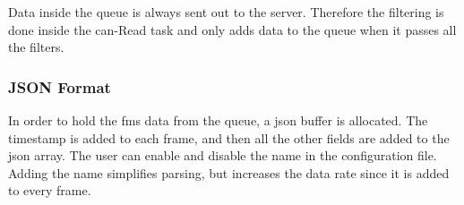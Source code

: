 Data inside the queue is always sent out to the server. Therefore the filtering is done inside the \acrshort{can}-Read task and only adds data to the queue when it passes all the filters.  

\subsubsection{JSON Format}
In order to hold the \acrshort{fms} data from the queue, a \acrshort{json} buffer is allocated. The timestamp is added to each frame, and then all the other fields are added to the \acrshort{json} array. The user can enable and disable the name in the configuration file. Adding the name simplifies parsing, but increases the data rate since it is added to every frame.

\begin{table}[h!]
    \begin{center}
\end{center}
\end{table}
